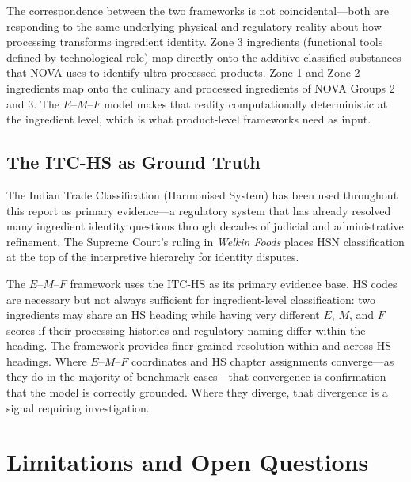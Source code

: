\documentclass[12pt,a3paper]{article}
\begin{document}
The correspondence between the two frameworks is not coincidental---both are responding to the same underlying physical and regulatory reality about how processing transforms ingredient identity. Zone 3 ingredients (functional tools defined by technological role) map directly onto the additive-classified substances that NOVA uses to identify ultra-processed products. Zone 1 and Zone 2 ingredients map onto the culinary and processed ingredients of NOVA Groups 2 and 3. The $E$--$M$--$F$ model makes that reality computationally deterministic at the ingredient level, which is what product-level frameworks need as input.

\subsection{The ITC-HS as Ground Truth}

The Indian Trade Classification (Harmonised System) has been used throughout this report as primary evidence---a regulatory system that has already resolved many ingredient identity questions through decades of judicial and administrative refinement. The Supreme Court's ruling in \textit{Welkin Foods} \cite{WelkinFoods_2026} places HSN classification at the top of the interpretive hierarchy for identity disputes.

The $E$--$M$--$F$ framework uses the ITC-HS as its primary evidence base. HS codes are necessary but not always sufficient for ingredient-level classification: two ingredients may share an HS heading while having very different $E$, $M$, and $F$ scores if their processing histories and regulatory naming differ within the heading. The framework provides finer-grained resolution within and across HS headings. Where $E$--$M$--$F$ coordinates and HS chapter assignments converge---as they do in the majority of benchmark cases---that convergence is confirmation that the model is correctly grounded. Where they diverge, that divergence is a signal requiring investigation.

\newpage


\section{Limitations and Open Questions}
\label{ch:limitations}
\end{document}

